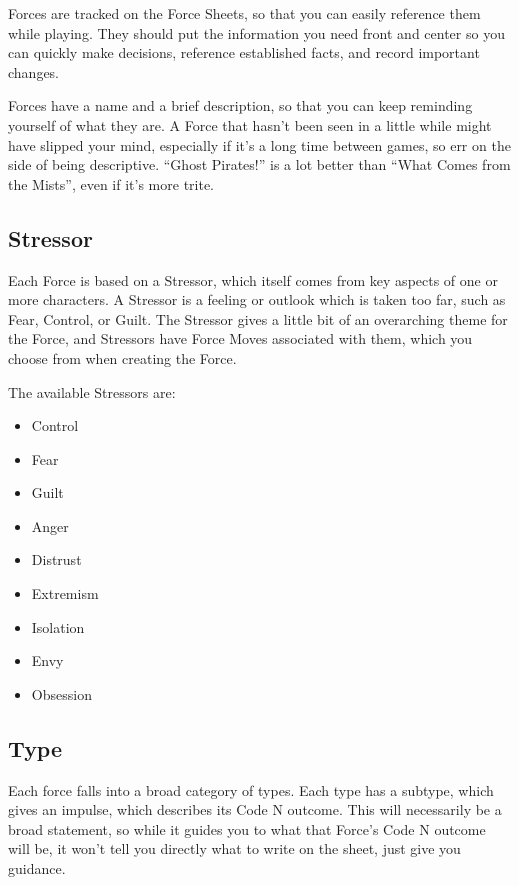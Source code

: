 \documentclass[
  oneside,
  statementpaper,
  9pt]{memoir}
\begin{document}
Forces are tracked on the Force Sheets, so that you can easily reference
them while playing. They should put the information you need front and
center so you can quickly make decisions, reference established facts,
and record important changes.

Forces have a name and a brief description, so that you can keep
reminding yourself of what they are. A Force that hasn't been seen in a
little while might have slipped your mind, especially if it's a long
time between games, so err on the side of being descriptive. ``Ghost
Pirates!'' is a lot better than ``What Comes from the Mists'', even if
it's more trite.

\hypertarget{stressor}{%
\subsection{Stressor}\label{stressor}}

Each Force is based on a Stressor, which itself comes from key aspects
of one or more characters. A Stressor is a feeling or outlook which is
taken too far, such as Fear, Control, or Guilt. The Stressor gives a
little bit of an overarching theme for the Force, and Stressors have
Force Moves associated with them, which you choose from when creating
the Force.

The available Stressors are:

\begin{itemize}
\item
  Control
\item
  Fear
\item
  Guilt
\item
  Anger
\item
  Distrust
\item
  Extremism
\item
  Isolation
\item
  Envy
\item
  Obsession
\end{itemize}

\hypertarget{type}{%
\subsection{Type}\label{type}}

Each force falls into a broad category of types. Each type has a
subtype, which gives an impulse, which describes its Code N outcome.
This will necessarily be a broad statement, so while it guides you to
what that Force's Code N outcome will be, it won't tell you directly
what to write on the sheet, just give you guidance.
\end{document}

